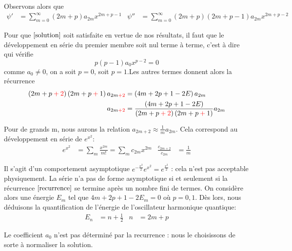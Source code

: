 \documentclass[../Notesdecours.tex]{subfiles}
\begin{document}
Observons alors que
\begin{align}
    \psi' &= \sum_{m = 0}^{\infty}\left(2m+p\right)a_{2m}x^{2m+p-1} & \psi'' &= \sum_{m = 0}^{\infty}\left(2m+p\right)\left(2m+p-1\right)a_{2m}x^{2m+p-2}
\end{align}

Pour que $\eqref{solution}$ soit satisfaite en vertue de nos résultats, il faut que le développement en série du premier membre soit nul terme à terme, c'est à dire qui vérifie
\begin{equation}
    p(p-1)a_0x^{p-2} = 0
\end{equation}
comme $a_0 \neq 0$, on a soit $p = 0$, soit $p = 1$.Les autres termes donnent alors la récurrence
\begin{align}
    \left(2m+p\color{red}+2\color{black}\right)\left(2m+p\color{red}+\color{black}1\right)a_{2m\color{red}+2\color{black}}&= \left(4m+2p+1-2E\right)a_{2m} \\
    a_{2m\color{red}+2\color{black}} &= \frac{\left(4m+2p+1-2E\right)}{\left(2m+p\color{red}+2\color{black}\right)\left(2m+p\color{red}+\color{black}1\right)}a_{2m}  \label{recurrence}
\end{align}

Pour de grands m, nous aurons la relation $a_{2m+2} \approx \frac{1}{m}a_{2m}$. Cela correspond au développement en série de $e^{x^2}$:
\begin{align}
    e^{x^2} &= \sum_m \frac{x^{2m}}{m!} = \sum_m c_{2m}x^{2m} & \frac{c_{2m+2}}{c_{2m}} &= \frac{1}{m}
\end{align}

Il s'agit d'un comportement asymptotique $e^{-\frac{x^2}{2}}e^{x^2} = e^{\frac{x^2}{2}}$ : cela n'est pas acceptable physiquement. La série n'a pas de forme asymptotique si et seulement si la récurrence $\eqref{recurrence}$ se termine après un nombre fini de termes. On considère alors une énergie $E_m$ tel que $4m+2p+1-2E_m = 0$ où $p = 0,1$. Dès lors, nous déduisons la quantification de l'énergie de l'oscillateur harmonique quantique:
\begin{align}
    E_n &= n+\frac{1}{2} & n &= 2m+p
\end{align}

\begin{remark}
    Le coefficient $a_0$ n'est pas déterminé par la recurrence : nous le choisissons de sorte à normaliser la solution.
\end{remark}
\end{document}
